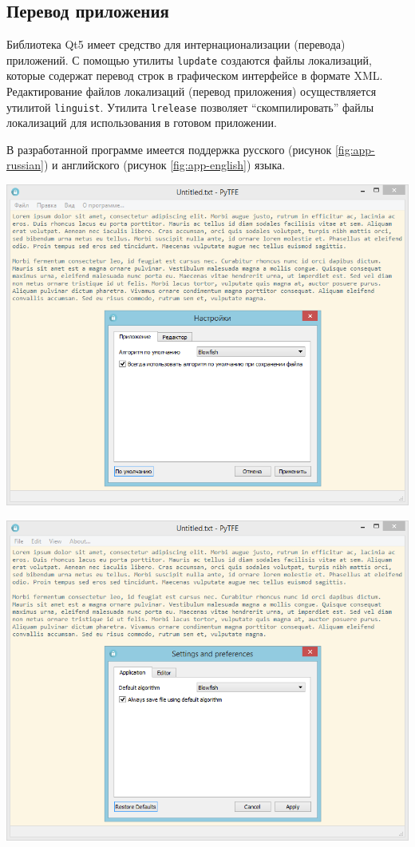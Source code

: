 \subsection{Перевод приложения}

Библиотека Qt5 имеет средство для интернационализации (перевода) приложений.
С помощью утилиты \texttt{lupdate} создаются файлы локализаций,
которые содержат перевод строк в графическом интерфейсе в формате XML.
Редактирование файлов локализаций (перевод приложения)
осуществляется утилитой \texttt{linguist}. Утилита \texttt{lrelease} позволяет
``скомпилировать'' файлы локализаций для использования в готовом приложении.

В разработанной программе имеется поддержка
русского (рисунок \ref{fig:app-russian})
и английского (рисунок \ref{fig:app-english}) языка.

\noindent
\begin{minipage}{\linewidth}
  \vspace{3.5mm}
  \centering
  \includegraphics[scale=0.6]{./pics/te/app-russian.png}
  \label{fig:app-russian}
  \vspace{3.5mm}
\end{minipage}

\noindent
\begin{minipage}{\linewidth}
  \vspace{3.5mm}
  \centering
  \includegraphics[scale=0.6]{./pics/te/app-english.png}
  \label{fig:app-english}
  \vspace{3.5mm}
\end{minipage}
